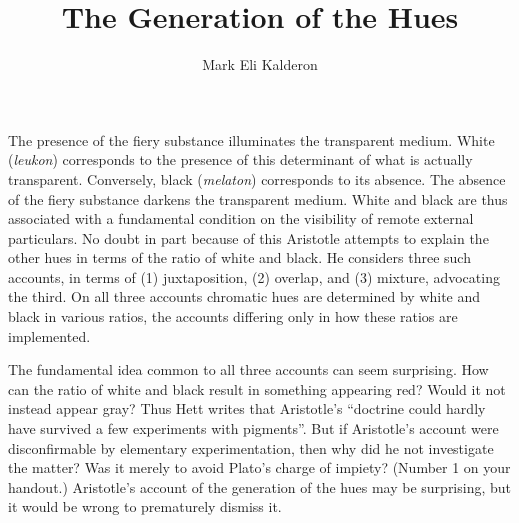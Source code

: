 %
%
%

\newcommand{\change}{\textcolor{blue}{\textbf{CHANGE SLIDE}}}
\newcommand\myauthor{Mark Eli Kalderon} 
\newcommand\mytitle{The Generation of the Hues}
\newcommand\myinstitution{University College London}


\usepackage{pgf}
\usepackage{tikz}
\usepackage{hyperref}


\title{\mytitle}

\author{\myauthor}
\institute{\myinstitution}

\date{}



\frame{\maketitle}

The presence of the fiery substance illuminates the transparent me\-di\-um. White (\emph{leukon}) corresponds to the presence of this determinant of what is actually transparent. Conversely, black (\emph{melaton}) corresponds to its absence. The absence of the fiery substance darkens the transparent medium. White and black are thus associated with a fundamental condition on the visibility of remote external particulars. No doubt in part because of this Aristotle attempts to explain the other hues in terms of the ratio of white and black. He considers three such accounts, in terms of (1) juxtaposition, (2) overlap, and (3) mixture, advocating the third. On all three accounts chromatic hues are determined by white and black in various ratios, the accounts differing only in how these ratios are implemented. 

The fundamental idea common to all three accounts can seem surprising. How can the ratio of white and black result in something appearing red? Would it not instead appear gray? Thus Hett writes that Aristotle's ``doctrine could hardly have survived a few experiments with pigments''. But if Aristotle's account were disconfirmable by elementary experimentation, then why did he not investigate the matter? Was it merely to avoid Plato's charge of impiety? (Number 1 on your handout.) Aristotle's account of the generation of the hues may be surprising, but it would be wrong to prematurely dismiss it. 

